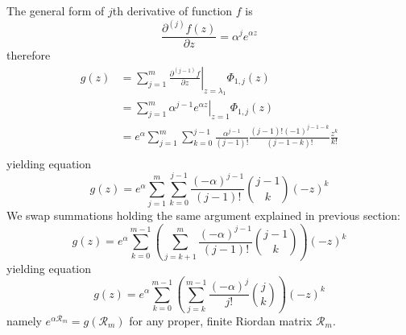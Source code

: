 
The general form of $j$th derivative of function $f$ is 
$$\frac{\partial^{(j)}{f}(z)}{\partial{z}} = \alpha^{j} e^{\alpha z}$$ 
therefore
\begin{displaymath}
\begin{split}
  g(z) &= \sum_{j=1}^{m}{ \left. \frac{\partial^{(j-1)}{f}}{\partial{z}} \right|_{z=\lambda_{1}}\Phi_{1,j}(z)} \\
       &= \sum_{j=1}^{m}{ \left. \alpha^{j-1} e^{\alpha z} \right|_{z=1}\Phi_{1,j}(z)} \\
       &= e^{\alpha}\sum_{j=1}^{m}{\sum_{k=0}^{j-1}{\frac{\alpha^{j-1}}{(j-1)!}  \frac{(j-1)!(-1)^{j-1-k}}{(j-1-k)!}\frac{z^{k}}{k!}}}\\
\end{split}
\end{displaymath}
yielding equation
\begin{equation}
  g(z) = e^{\alpha}\sum_{j=1}^{m}{\sum_{k=0}^{j-1}{\frac{(-\alpha)^{j-1}}{(j-1)!}{{j-1}\choose{k}}(-z)^{k}}} 
\end{equation}
We swap summations holding the same argument explained in previous section:
\begin{displaymath}
  g(z) = e^{\alpha}\sum_{k=0}^{m-1}{\left(\sum_{j=k+1}^{m}{\frac{(-\alpha)^{j-1}}{(j-1)!}{{j-1}\choose{k}}}\right)(-z)^{k}}
\end{displaymath}
yielding equation
\begin{equation}
  g(z) = e^{\alpha}\sum_{k=0}^{m-1}{\left(\sum_{j=k}^{m-1}{\frac{(-\alpha)^{j}}{j!}{{j}\choose{k}}}\right)(-z)^{k}}
\end{equation}
namely $e^{\alpha\mathcal{R}_{m}}=g(\mathcal{R}_{m})$ for any proper, 
finite Riordan matrix $\mathcal{R}_{m}$.

